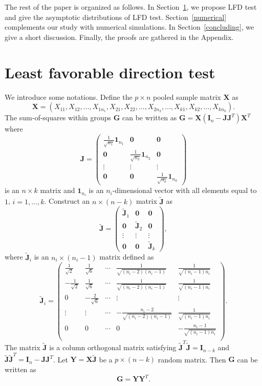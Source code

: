 \documentclass[12pt]{article} %
\newcommand{\bX}{\mathbf{X}}
\newcommand{\bY}{\mathbf{Y}}
\newcommand{\bG}{\mathbf{G}}
\newcommand{\bJ}{\mathbf{J}}
\newcommand{\bI}{\mathbf{I}}
\theoremstyle{definition}
\begin{document}
    The rest of the paper is organized  as follows.
    In Section~\ref{methodology}, we propose LFD test and give
    the asymptotic distributions of LFD test.
     Section~\ref{numerical} complements our study with numerical simulations.
     In Section~\ref{concluding}, we give a short discussion.
     Finally, the proofs are gathered in the Appendix.





 
\section{Least favorable direction test}\label{methodology}
We introduce some notations.
 Define the $p\times n$ pooled sample matrix $\bX$ as
 $$\bX=(X_{11},X_{12},\ldots,X_{1n_1},X_{21},X_{22},\ldots,X_{2n_2},\ldots,X_{k1},X_{k2},\ldots,X_{kn_k}).$$
 The sum-of-squares within groups $\bG$ can be written as $\bG=\bX(\bI_n-\bJ\bJ^T)\bX^T$ where
 $$
 \bJ=\begin{pmatrix}
     \frac{1}{\sqrt{n_1}}\mathbf{1}_{n_1}&\mathbf{0} & \mathbf{0}\\
     \mathbf{0}&\frac{1}{\sqrt{n_2}} \mathbf{1}_{n_2}& \mathbf{0}\\
     \vdots &\vdots &\vdots \\
     \mathbf{0}&\mathbf{0}&\frac{1}{\sqrt{n_k}}\mathbf{1}_{n_k}
 \end{pmatrix}
 $$
 is an $n\times k$ matrix
 and $\mathbf{1}_{n_i}$ is an $n_i$-dimensional vector with all elements equal to $1$, $i=1,\ldots, k$.
 Construct an $n\times (n-k)$ matrix $\tilde{\bJ}$ as 
 $$
 \tilde{\bJ}=\begin{pmatrix}
     \tilde{\bJ}_1&\mathbf{0} & \mathbf{0}\\
     \mathbf{0}&\tilde{\bJ}_2& \mathbf{0}\\
     \vdots &\vdots &\vdots \\
     \mathbf{0}&\mathbf{0}&\tilde{\bJ}_k
 \end{pmatrix},
 $$
 where $\tilde{\bJ}_i$ is an $n_i\times (n_{i}-1)$ matrix defined as
 $$
\tilde{\bJ}_i=\begin{pmatrix}
    \frac{1}{\sqrt{2}}&\frac{1}{\sqrt{6}}&\cdots&\frac{1}{\sqrt{(n_i-2)(n_i-1)}}&\frac{1}{\sqrt{(n_i-1)n_i}}\\
    -\frac{1}{\sqrt{2}}&\frac{1}{\sqrt{6}}&\cdots&\frac{1}{\sqrt{(n_i-2)(n_i-1)}}&\frac{1}{\sqrt{(n_i-1)n_i}}\\
    0&-\frac{2}{\sqrt{6}}&\cdots&\vdots&\vdots\\
    \vdots&\vdots&\cdots&-\frac{n_i-2}{\sqrt{(n_i-2)(n_i-1)}}&\frac{1}{\sqrt{(n_i-1)n_i}}\\
    0&0&\cdots&0&-\frac{n_i-1}{\sqrt{(n_i-1)n_i}}\\
\end{pmatrix}.
 $$
The matrix $\tilde{\bJ}$ is a column orthogonal matrix  satisfying $\tilde{\bJ}^T\tilde{\bJ}=\bI_{n-k}$ and $\tilde{\bJ}\tilde{\bJ}^T =\bI_n-\bJ\bJ^T$.
Let $\bY=\bX\tilde{\bJ}$ be a $p\times (n-k)$ random matrix.
Then $\bG$ can be written as
$$\bG=
\bY \bY^T.
$$
\end{document}
